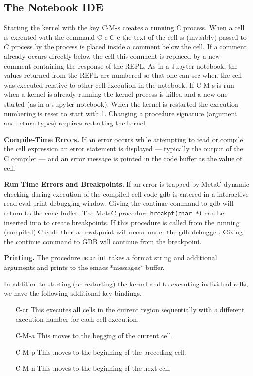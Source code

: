 \documentclass{article}
\begin{document}
\subsection{The Notebook IDE}
\label{sec:emacs}

Starting the kernel with the key C-M-s creates a running C process.  When a cell is executed
with the command C-c C-c the text of the cell is (invisibly) passed to $C$ process by the process is
placed inside a comment below the cell.  If a comment already occurs directly below the cell this
comment is replaced by a new comment containing the response of the REPL.  As in a Jupyter notebook,
the values returned from the REPL are numbered so that one can see when the cell was executed
relative to other cell execution in the notebook.  If C-M-s is run when a kernel is already running
the kernel process is killed and a new one started (as in a Jupyter notebook).  When the kernel is
restarted the execution numbering is reset to start with 1.  Changing a procedure signature
(argument and return types) requires restarting the kernel.


{\bf Compile-Time Errors.}
If an error occurs while attempting to read or compile the cell expression an error statement is displayed --- typically the output of the C compiler --- and
an error message is printed in the code buffer as the value of cell.

{\bf Run Time Errors and Breakpoints.} If an error is trapped by MetaC dynamic checking during execution of the compiled cell code
gdb is entered in a interactive read-eval-print debugging window.  Giving the continue command to gdb will return to the code buffer.
The MetaC procedure {\tt breakpt(char *)} can be inserted into to create breakpoints.  If this procedure is called from the
running (compiled) C code then a breakpoint will occur under the gdb debugger.  Giving the continue command to GDB will continue from the breakpoint.

{\bf Printing.} The procedure {\tt mcprint} takes a format string and additional arguments and prints to the emacs *messages* buffer.

In addition to starting (or restarting) the kernel and to executing individual cells, we have the following additional key bindings.

\begin{itemize}
\item[C-cr] This executes all cells in the current region sequentially with a different execution number for each cell execution.

\item[C-M-a] This moves to the begging of the current cell.

\item[C-M-p] This moves to the beginning of the preceding cell.

\item[C-M-n] This moves to the beginning of the next cell.


\end{itemize}
\end{document}
